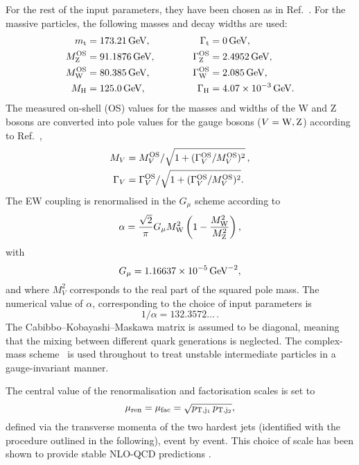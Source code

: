 \documentclass[11pt,epsf]{article}
\begin{document}
    For the rest of the input parameters, they have been chosen as in Ref.~\cite{Ballestrero:2018anz}.
    For the massive particles, the following masses and decay widths are used:
    \begin{alignat}{2}
                      m_\text{t}   &=  173.21\,\text{GeV},       & \quad \quad \quad \Gamma_\text{t} &= 0 \,\text{GeV},  \nonumber \\
                    M_\text{Z}^\text{OS} &=  91.1876\,\text{GeV},      & \quad \quad \quad \Gamma_\text{Z}^\text{OS} &= 2.4952\,\text{GeV},  \nonumber \\
                    M_\text{W}^\text{OS} &=  80.385\,\text{GeV},       & \Gamma_\text{W}^\text{OS} &= 2.085\,\text{GeV},  \nonumber \\
                    M_{\rm H} &=  125.0\,\text{GeV},       &  \Gamma_\text{H}   &=  4.07 \times 10^{-3}\,\text{GeV}.
    \end{alignat}
    The measured on-shell (OS) values for the masses and widths of the W and Z bosons are converted into pole values for the gauge bosons ($V=\text{W},\text{Z}$) according to Ref.~\cite{Bardin:1988xt},
    \begin{equation}
    \begin{split}
            M_V &= M_{V}^\text{OS}/\sqrt{1+(\Gamma_{V}^\text{OS}/M_{V}^\text{OS})^2}\,, \\
       \Gamma_V &= \Gamma_{V}^\text{OS}/\sqrt{1+(\Gamma_{V}^\text{OS}/M_{V}^\text{OS})^2}.
    \end{split}
    \end{equation}
    The EW coupling is renormalised in the $G_\mu$ scheme \cite{Denner:2000bj} according to 
    \begin{equation}
    \alpha =  \frac{\sqrt{2}}{\pi} G_{\mu} M_{\rm W}^2 \left(1-\frac{M_{\rm W}^2}{M_{\rm Z}^2} \right),
    \end{equation}
    with
    \begin{equation}
        G_{\mu}    = 1.16637\times 10^{-5}\,\text{GeV}^{-2},
    \end{equation}
    and where $M_V^2$ corresponds to the real part of the squared pole mass.
    The numerical value of $\alpha$, corresponding to the choice of input parameters is
    \begin{equation}
     1/\alpha = 132.3572\ldots\,.
    \end{equation}
    The Cabibbo--Kobayashi--Maskawa matrix is assumed to be diagonal, meaning that the mixing between different quark generations is neglected.
    The complex-mass scheme~\cite{Denner:1999gp,Denner:2005fg,Denner:2006ic} is used throughout to treat unstable intermediate particles in a gauge-invariant manner.

    The central value of the renormalisation and factorisation scales is set to 
    \begin{equation}
    \label{eq:defscale}
     \mu_{\rm ren} = \mu_{\rm fac} = \sqrt{p_{\rm T, j_1}\, p_{\rm T, j_2}}, 
    \end{equation}
    defined via the transverse momenta of the two hardest jets (identified with the procedure outlined in the following), 
    event by event.
    This choice of scale has been shown to provide stable NLO-QCD predictions \cite{Denner:2012dz}.
\end{document}
